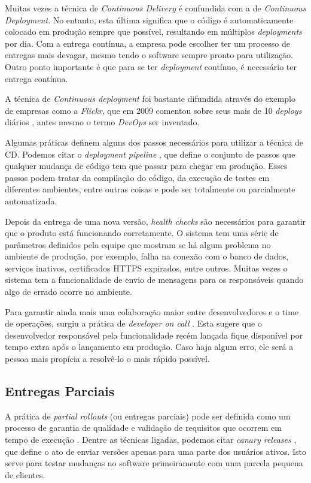Muitas vezes a técnica de \emph{Continuous Delivery} é confundida com a de \emph{Continuous Deployment}. No entanto, esta última significa que o código é automaticamente colocado em produção sempre que possível, resultando em múltiplos \emph{deployments} por dia. Com a entrega contínua, a empresa pode escolher ter um processo de entregas mais devagar, mesmo tendo o software sempre pronto para utilização. Outro ponto importante é que para se ter \emph{deployment} contínuo, é necessário ter entrega contínua.

A técnica de \emph{Continuous deployment} foi bastante difundida através do exemplo de empresas como a \emph{Flickr}, que em 2009 comentou sobre seus mais de 10 \emph{deploys} diários \cite{flickrTalk}, antes mesmo o termo \emph{DevOps} ser inventado. 

Algumas práticas definem alguns dos passos necessários para utilizar a técnica de CD. Podemos citar o \emph{deployment pipeline} \cite{devopsBook}, que define o conjunto de passos que qualquer mudança de código tem que passar para chegar em produção. Esses passos podem tratar da compilação do código, da execução de testes em diferentes ambientes, entre outras coisas e pode ser totalmente ou parcialmente automatizada.

Depois da entrega de uma nova versão, \emph{health checks} \cite{devopsBook} são necessários para garantir que o produto está funcionando corretamente. O sistema tem uma série de parâmetros definidos pela equipe que mostram se há algum problema no ambiente de produção, por exemplo, falha na conexão com o banco de dados, serviços inativos, certificados HTTPS expirados, entre outros. Muitas vezes o sistema tem a funcionalidade de envio de mensagens para os responsáveis quando algo de errado ocorre no ambiente.

Para garantir ainda mais uma colaboração maior entre desenvolvedores e o time de operações, surgiu a prática de \emph{developer on call} \cite{devAndDeploymentFB}. Esta sugere que o desenvolvedor responsável pela funcionalidade recém lançada fique disponível por tempo extra após o lançamento em produção. Caso haja algum erro, ele será a pessoa mais propícia a resolvê-lo o mais rápido possível.

\subsection{Entregas Parciais}
A prática de \emph{partial rollouts} (ou entregas parciais) pode ser definida como um processo de garantia de qualidade e validação de requisitos que ocorrem em tempo de execução \cite{empiricalStudy2016}. Dentre as técnicas ligadas, podemos citar \emph{canary releases} \cite{continuousDeliveryBook}, que define o ato de enviar versões apenas para uma parte dos usuários ativos. Isto serve para testar mudanças no software primeiramente com uma parcela pequena de clientes.

